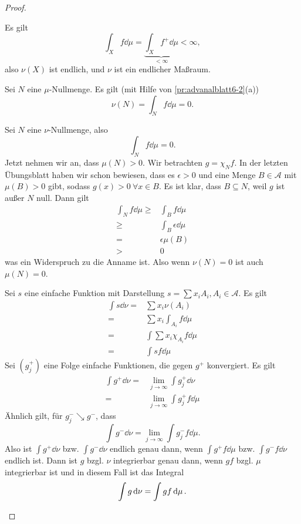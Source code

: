 \begin{proof}
\begin{parts}
\begin{enumerate}[label=(\roman*)]
			Es gilt
			\[
			\int_X f\dd{\mu}=\underbrace{\int_X f^+\dd{\mu}}_{<\infty}<\infty
			,\]
			also $\nu(X)$ ist endlich, und $\nu$ ist ein endlicher Maßraum.
		\end{enumerate}
	\item Sei $N$ eine $\mu$-Nullmenge. Es gilt (mit Hilfe von \ref{pr:advanalblatt6-2}(a)) 
		\[
			\nu(N)=\int_N f\dd{\mu}=0
		.\] 
	\item Sei $N$ eine $\nu$-Nullmenge, also
		\[
			\int_N f\dd{\mu}=0
		.\] 
		Jetzt nehmen wir an, dass $\mu(N)>0$. Wir betrachten $g=\chi_N f$. In der letzten Übungsblatt haben wir schon bewiesen, dass es $\epsilon>0$ und eine Menge $B\in\mathcal{A}$ mit $\mu(B)>0$ gibt, sodass $g(x)>0~\forall x\in B$. Es ist klar, dass $B\subseteq N$, weil $g$ ist außer $N$ null. Dann gilt
		\begin{align*}
			\int_N f\dd{\mu}\ge& \int_B f\dd{\mu}\\
			\ge& \int_B \epsilon\dd{\mu}\\
			=& \epsilon\mu(B)\\
			>&0
		\end{align*}
		was ein Widerspruch zu die Anname ist. Also wenn $\nu(N)=0$ ist auch $\mu(N)=0$.
	\item Sei $s$ eine einfache Funktion mit Darstellung $s=\sum x_i A_i, A_i\in \mathcal{A}$. Es gilt
		\begin{align*}
			\int s\dd{\nu}=& \sum x_i \nu(A_i)\\
			=& \sum x_i\int_{A_i}f\dd{\mu}\\
			=&\int \sum x_i \chi_{A_i}f\dd{\mu}\\
			=&\int sf\dd{\mu}
		\end{align*}
		Sei $(g_j^+)$ eine Folge einfache Funktionen, die gegen $ g^+$ konvergiert. Es gilt
		\begin{align*}
			\int g^+\dd{\nu}=&\lim_{j \to \infty} \int g^+_j\dd{\nu}\\
			=&\lim_{j \to \infty} \int g^+_j f\dd{\mu}
		\end{align*}
		Ähnlich gilt, f\"{u}r $g_j^-\searrow g^-$, dass
		\[
			\int g^-\dd{\nu}=\lim_{j \to \infty} \int g^-_j f\dd{\mu}
		.\] 
		Also ist $\int g^+\dd{\nu}$ bzw. $\int g^- \dd{\nu}$ endlich genau dann, wenn $\int g^+f\dd{\mu}$ bzw. $\int g^- f\dd{\nu}$ endlich ist. Dann ist $g$ bzgl. $\nu$ integrierbar genau dann, wenn $gf$ bzgl. $\mu$ integrierbar ist und in diesem Fall ist das Integral
		\[
			\int g\dd{\nu}=\int gf\dd{\mu}
		.\qedhere\] 
	\end{parts}
\end{proof}
